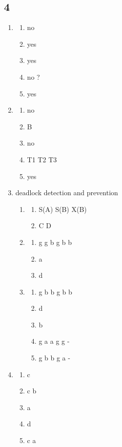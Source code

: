 \documentclass[11pt]{article}
\begin{document}
\subsection{4}
\label{sec:orgfc350e2}
\begin{enumerate}
\item \begin{enumerate}
\item no
\item yes
\item yes
\item no ?
\item yes
\end{enumerate}
\item \begin{enumerate}
\item no
\item B
\item no
\item T1 T2 T3
\item yes
\end{enumerate}
\item deadlock detection and prevention
\begin{enumerate}
\item \begin{enumerate}
\item S(A) S(B) X(B)
\item C D
\end{enumerate}
\item \begin{enumerate}
\item g g  b g b b
\item a
\item d
\end{enumerate}
\item \begin{enumerate}
\item g b b g b b
\item d
\item b
\item g a a g g -
\item g b b g a -
\end{enumerate}
\end{enumerate}
\item \begin{enumerate}
\item c
\item c b
\item a
\item d
\item c a
\end{enumerate}
\end{enumerate}
\end{document}
